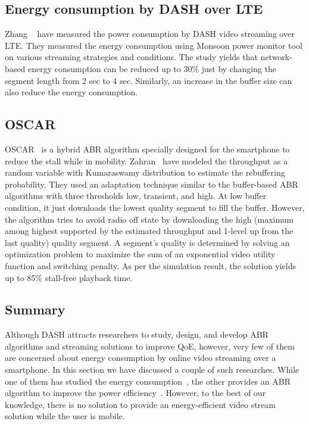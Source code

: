 \subsection{Energy consumption by DASH over LTE}
Zhang \etal\ \cite{10.1145/2910018.2910656} have measured the power consumption by DASH video streaming over LTE. They measured the energy consumption using Monsoon power monitor \cite{monsoonmonitor} tool on various streaming strategies and conditions. The study yields that network-based energy consumption can be reduced up to 30\% just by changing the segment length from 2 sec to 4 sec. Similarly, an increase in the buffer size can also reduce the energy consumption.

\subsection{OSCAR}
OSCAR~\cite{10.1145/2910018.2910655} is a hybrid ABR algorithm specially designed for the smartphone to reduce the stall while in mobility. Zahran \etal\ have modeled the throughput as a random variable with Kumaraswamy distribution \cite{jones2009kumaraswamy} to estimate the rebuffering probability. They used an adaptation technique similar to the buffer-based ABR algorithms with three thresholds low, transient, and high. At low buffer condition, it just downloads the lowest quality segment to fill the buffer. However, the algorithm tries to avoid radio off state by downloading the high (maximum among highest supported by the estimated throughput and 1-level up from the last quality) quality segment. A segment's quality is determined by solving an optimization problem to maximize the sum of an exponential video utility function and switching penalty. As per the simulation result, the solution yields up to 85\% stall-free playback time.

\subsection{Summary}
Although DASH attracts researchers to study, design, and develop ABR algorithms and streaming solutions to improve QoE, however, very few of them are concerned about energy consumption by online video streaming over a smartphone. In this section we have discussed a couple of such researches. While one of them has studied the energy consumption~\cite{10.1145/2910018.2910656}, the other provides an ABR algorithm to improve the power efficiency~\cite{10.1145/2910018.2910655}. However, to the best of our knowledge, there is no solution to provide an energy-efficient video stream solution while the user is mobile.